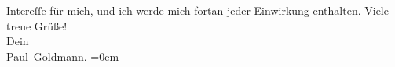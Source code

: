 \begin{ledgroupsized}[t]{13cm}
               Intereſſe für mich, und ich werde mich fortan jeder Einwirkung enthalten.\pend
           \pstart
           Viele treue Grüße! {\\[\baselineskip]}Dein {\\[\baselineskip]}\spacefill\mbox{Paul Goldmann.}\pend
           \leftskip=0em{}
         
         \endnumbering{}\end{ledgroupsized}  \newcommand{\dateiname}{L02898}\newcommand{\titel}{Paul Goldmann an Arthur Schnitzler, 11. 12. [1899]}\newcommand{\editorInnen}{Martin Anton Müller und Laura Untner}
      